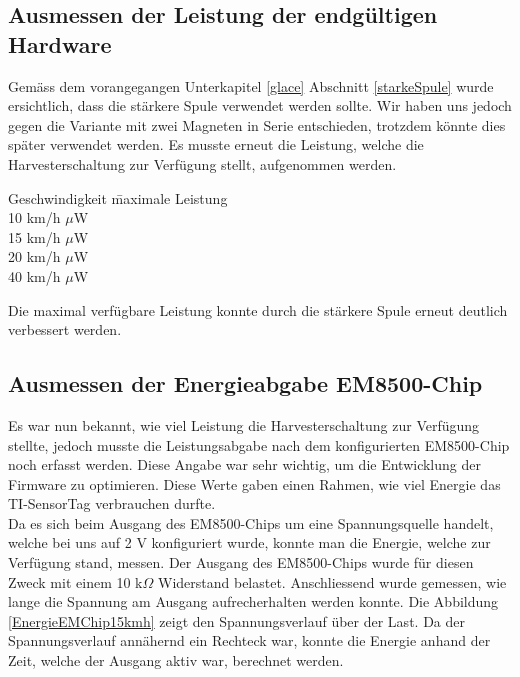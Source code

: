 \subsection{Ausmessen der Leistung der endgültigen Hardware}

Gemäss dem vorangegangen Unterkapitel \ref{glace} Abschnitt \ref{starkeSpule} wurde ersichtlich, dass die stärkere Spule verwendet werden sollte. Wir haben uns jedoch gegen die Variante mit zwei Magneten in Serie entschieden, trotzdem könnte dies später verwendet werden. Es musste erneut die Leistung, welche die Harvesterschaltung zur Verfügung stellt, aufgenommen werden.\\


\begin{minipage}{\textwidth}
\begin{tabbing}
    Geschwindigkeit   	\quad\= maximale Leistung    \\[0.8ex]
    10 km/h		         $\mu$W\\
	15 km/h		         $\mu$W\\
	20 km/h		         $\mu$W\\
	40 km/h		         $\mu$W\\
\end{tabbing}
\end{minipage}

Die maximal verfügbare Leistung konnte durch die stärkere Spule erneut deutlich verbessert werden. 

\subsection{Ausmessen der Energieabgabe EM8500-Chip}
\label{em_enerige_ausgang}

Es war nun bekannt, wie viel Leistung die Harvesterschaltung zur Verfügung stellte, jedoch musste die Leistungsabgabe nach dem konfigurierten EM8500-Chip noch erfasst werden. Diese Angabe war sehr wichtig, um die Entwicklung der Firmware zu optimieren. Diese Werte gaben einen Rahmen, wie viel Energie das TI-SensorTag verbrauchen durfte.\\

Da es sich beim Ausgang des EM8500-Chips um eine Spannungsquelle handelt, welche bei uns auf 2 V konfiguriert wurde, konnte man die Energie, welche zur Verfügung stand, messen. Der Ausgang des EM8500-Chips wurde für diesen Zweck mit einem 10 k$\Omega$ Widerstand belastet. Anschliessend wurde gemessen, wie lange die Spannung am Ausgang aufrecherhalten werden konnte. Die Abbildung \ref{EnergieEMChip15kmh} zeigt den Spannungsverlauf über der Last. Da der Spannungsverlauf annähernd ein Rechteck war, konnte die Energie anhand der Zeit, welche der Ausgang aktiv war, berechnet werden.

